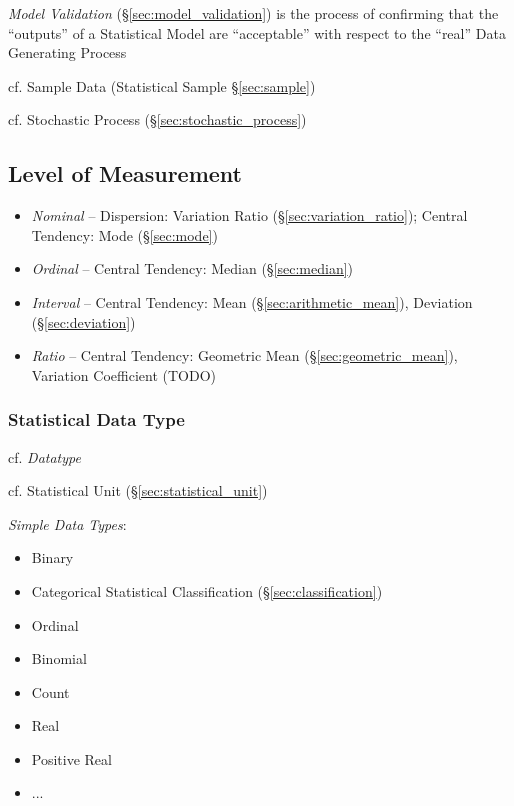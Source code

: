 \fist \emph{Model Validation} (\S\ref{sec:model_validation}) is the process of
confirming that the ``outputs'' of a Statistical Model are ``acceptable'' with
respect to the ``real'' Data Generating Process

\fist cf. Sample Data (Statistical Sample \S\ref{sec:sample})

\fist cf. Stochastic Process (\S\ref{sec:stochastic_process})



\subsection{Level of Measurement}\label{sec:measurement_level}

\begin{itemize}
  \item \emph{Nominal} -- Dispersion: Variation Ratio
    (\S\ref{sec:variation_ratio}); Central Tendency: Mode (\S\ref{sec:mode})
  \item \emph{Ordinal} -- Central Tendency: Median (\S\ref{sec:median})
  \item \emph{Interval} -- Central Tendency: Mean (\S\ref{sec:arithmetic_mean}),
    Deviation (\S\ref{sec:deviation})
  \item \emph{Ratio} -- Central Tendency: Geometric Mean
    (\S\ref{sec:geometric_mean}), Variation Coefficient (TODO)
\end{itemize}



\subsubsection{Statistical Data Type}\label{sec:statistical_data_type}

\fist cf. \emph{Datatype}

cf. Statistical Unit (\S\ref{sec:statistical_unit})

\emph{Simple Data Types}:
\begin{itemize}
  \item Binary
  \item Categorical
    \fist Statistical Classification (\S\ref{sec:classification})
  \item Ordinal
  \item Binomial
  \item Count
  \item Real
  \item Positive Real
  \item ...
\end{itemize}

